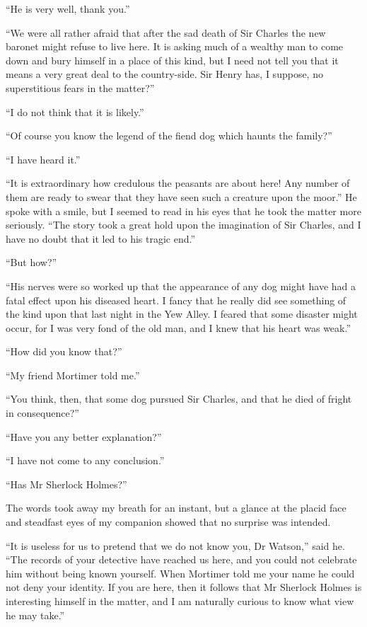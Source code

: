 \documentclass[paper=5.5in:8.5in,BCOR=7mm,twoside,DIV=calc,12pt,usegeometry,openany,chapterprefix,endperiod,headings=big]{scrbook} %
\begin{document}
\enquote{He is very well, thank you.}

\enquote{We were all rather afraid that after the sad death of Sir Charles the new baronet might refuse to live here. It is asking much of a wealthy man to come down and bury himself in a place of this kind, but I need not tell you that it means a very great deal to the country-side. Sir Henry has, I suppose, no superstitious fears in the matter?}

\enquote{I do not think that it is likely.}

\enquote{Of course you know the legend of the fiend dog which haunts the family?}

\enquote{I have heard it.}

\enquote{It is extraordinary how credulous the peasants are about here! Any number of them are ready to swear that they have seen such a creature upon the moor.} He spoke with a smile, but I seemed to read in his eyes that he took the matter more seriously. \enquote{The story took a great hold upon the imagination of Sir Charles, and I have no doubt that it led to his tragic end.}

\enquote{But how?}

\enquote{His nerves were so worked up that the appearance of any dog might have had a fatal effect upon his diseased heart. I fancy that he really did see something of the kind upon that last night in the Yew Alley. I feared that some disaster might occur, for I was very fond of the old man, and I knew that his heart was weak.}

\enquote{How did you know that?}

\enquote{My friend Mortimer told me.}

\enquote{You think, then, that some dog pursued Sir Charles, and that he died of fright in consequence?}

\enquote{Have you any better explanation?}

\enquote{I have not come to any conclusion.}

\enquote{Has Mr Sherlock Holmes?}

The words took away my breath for an instant, but a glance at the placid face and steadfast eyes of my companion showed that no surprise was intended.

\enquote{It is useless for us to pretend that we do not know you, Dr Watson,} said he. \enquote{The records of your detective have reached us here, and you could not celebrate him without being known yourself. When Mortimer told me your name he could not deny your identity. If you are here, then it follows that Mr Sherlock Holmes is interesting himself in the matter, and I am naturally curious to know what view he may take.}
\end{document}

